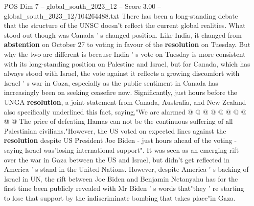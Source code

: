 \begin{textsample}{POS Dim 7 – global\_south\_2023\_12 – Score 3.00 – global\_south\_2023\_12/104264488.txt}
There has been a long-standing debate that the structure of the UNSC doesn't reflect the current global realities.
What stood out though was Canada ' s changed position.
Like India, it changed from \textbf{abstention} on October 27 to voting in favour of the \textbf{resolution} on Tuesday.
But why the two are different is because India ' s vote on Tuesday is more consistent with its long-standing position on Palestine and Israel, but for Canada, which has always stood with Israel, the vote against it reflects a growing discomfort with Israel ' s war in Gaza, especially as the public sentiment in Canada has increasingly been on seeking ceasefire now.
Significantly, just hours before the UNGA \textbf{resolution}, a joint statement from Canada, Australia, and New Zealand also specifically underlined this fact, saying,"We are alarmed @ @ @ @ @ @ @ @ @ @ The price of defeating Hamas can not be the continuous suffering of all Palestinian civilians."However, the US voted on expected lines against the \textbf{resolution} despite US President Joe Biden - just hours ahead of the voting - saying Israel was"losing international support".
It was seen as an emerging rift over the war in Gaza between the US and Israel, but didn't get reflected in America ' s stand in the United Nations.
However, despite America ' s backing of Israel in UN, the rift between Joe Biden and Benjamin Netanyahu has for the first time been publicly revealed with Mr Biden ' s words that"they ' re starting to lose that support by the indiscriminate bombing that takes place"in Gaza.

\end{textsample}
